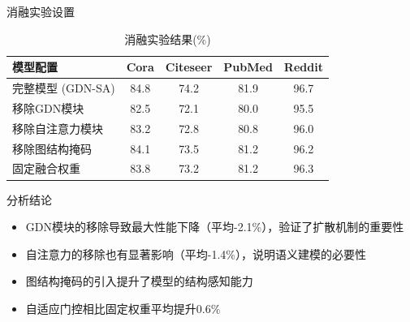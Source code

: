 \documentclass{beamer}
\makeatletter
\providecommand{\framesettitle}[1]{%
  \beamer@frametitle{#1}%
}
\makeatother
\begin{document}
\begin{frame}
  \framesettitle{消融实验结果分析}

  \begin{block}{消融实验设置}
    \begin{table}
      \centering
      \begin{tabular}{@{}lcccc@{}}
        \toprule
        模型配置 & Cora & Citeseer & PubMed & Reddit \\
        \midrule
        完整模型 (GDN-SA) & 84.8 & 74.2 & 81.9 & 96.7 \\
        移除GDN模块 & 82.5 & 72.1 & 80.0 & 95.5 \\
        移除自注意力模块 & 83.2 & 72.8 & 80.8 & 96.0 \\
        移除图结构掩码 & 84.1 & 73.5 & 81.2 & 96.2 \\
        固定融合权重 & 83.8 & 73.2 & 81.2 & 96.3 \\
        \bottomrule
      \end{tabular}
      \caption{消融实验结果(\%)}
    \end{table}
  \end{block}

  \vspace{0.3cm}

  \begin{block}{分析结论}
    \begin{itemize}
      \item GDN模块的移除导致最大性能下降（平均-2.1\%），验证了扩散机制的重要性
      \item 自注意力的移除也有显著影响（平均-1.4\%），说明语义建模的必要性
      \item 图结构掩码的引入提升了模型的结构感知能力
      \item 自适应门控相比固定权重平均提升0.6\%
    \end{itemize}
  \end{block}
\end{frame}
\end{document}
